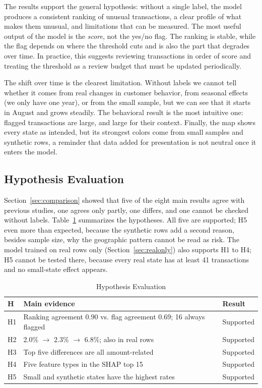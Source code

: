 \documentclass[journal]{IEEEtran}
\begin{document}
The results support the general hypothesis: without a single label, the model produces a consistent ranking of unusual transactions, a clear profile of what makes them unusual, and limitations that can be measured. The most useful output of the model is the \emph{score}, not the yes/no flag. The ranking is stable, while the flag depends on where the threshold cuts and is also the part that degrades over time. In practice, this suggests reviewing transactions in order of score and treating the threshold as a review budget that must be updated periodically.

The shift over time is the clearest limitation. Without labels we cannot tell whether it comes from real changes in customer behavior, from seasonal effects (we only have one year), or from the small sample, but we can see that it starts in August and grows steadily. The behavioral result is the most intuitive one: flagged transactions are large, and large for their context. Finally, the map shows every state as intended, but its strongest colors come from small samples and synthetic rows, a reminder that data added for presentation is not neutral once it enters the model.

\subsection{Hypothesis Evaluation}

Section~\ref{sec:comparison} showed that five of the eight main results agree with previous studies, one agrees only partly, one differs, and one cannot be checked without labels. Table~\ref{tab:hypotheses} summarizes the hypotheses. All five are supported; H5 even more than expected, because the synthetic rows add a second reason, besides sample size, why the geographic pattern cannot be read as risk. The model trained on real rows only (Section~\ref{sec:realonly}) also supports H1 to H4; H5 cannot be tested there, because every real state has at least 41 transactions and no small-state effect appears.

\begin{table}[!t]
\renewcommand{\arraystretch}{1.2}
\caption{Hypothesis Evaluation}
\label{tab:hypotheses}
\centering
\begin{tabular}{lp{}l}
\hline
\textbf{H} & \textbf{Main evidence} & \textbf{Result} \\
\hline
H1 & Ranking agreement 0.90 vs. flag agreement 0.69; 16 always flagged & Supported \\
H2 & 2.0\% $\rightarrow$ 2.3\% $\rightarrow$ 6.8\%; also in real rows & Supported \\
H3 & Top five differences are all amount-related & Supported \\
H4 & Five feature types in the SHAP top 15 & Supported \\
H5 & Small and synthetic states have the highest rates & Supported \\
\hline
\end{tabular}
\end{table}
\end{document}

